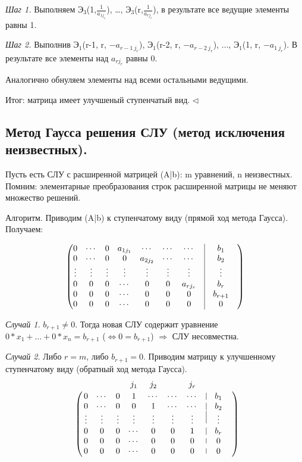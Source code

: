 \textit{Шаг 1.} Выполняем $Э_3$(1,$\frac{1}{a_{1j_1}}$), \dots, $Э_3$(r,$\frac{1}{a_{rj_r}}$), в результате все ведущие элементы равны 1.

\textit{Шаг 2.} Выполнив $Э_1$(r-1, r, $-a_{{r-1}\ j_r}$), $Э_1$(r-2, r, $-a_{{r-2}\ j_r}$), $\dots$, $Э_1$(1, r, $-a_{1\ j_r}$). В результате все элементы над $a_{rj_r}$ равны 0.

Аналогично обнуляем элементы над всеми остальными ведущими. 

Итог: матрица имеет улучшеный ступенчатый вид. $\lhd$

\vspace{\baselineskip}
\subsection{Метод Гаусса решения СЛУ (метод исключения неизвестных).}

Пусть есть СЛУ с расширенной матрицей (A|b): m уравнений, n неизвестных. Помним: элементарные преобразования строк расширенной матрицы не меняют множество решений.

Алгоритм. Приводим (A|b) к ступенчатому виду (прямой ход метода Гаусса). Получаем: 

\[
	\begin{pmatrix}
		0 & \cdots & 0 & a_{1j_1} & \cdots & \cdots & \cdots & \vrule & b_1 \\
		0 & \cdots & 0 & 0 & a_{2j_2} & \cdots & \cdots & \vrule & b_2 \\
       \vdots & \vdots & \vdots& \vdots & \vdots & \vdots & \vdots & \vrule & \vdots & \\ 
       0 & 0 & 0 & \cdots & 0 & 0 & a_{rj_r} & \vrule & b_r \\
       0 & 0 & 0 & \cdots & 0 & 0 & 0 & \vrule & b_{r+1} \\
       0 & 0 & 0 & \cdots & 0 & 0 & 0 & \vrule & 0
	\end{pmatrix}
\]


\textit{Случай 1.} $b_{r+1} \neq 0$. Тогда новая СЛУ содержит уравнение $0*x_1 + \dots + 0*x_n = b_{r+1}$ ($\Leftrightarrow 0 = b_{r+1}$) $\Rightarrow$ СЛУ несовместна.

\textit{Случай 2.} Либо $r = m$, либо $b_{r+1} = 0$. Приводим матрицу к улучшенному ступенчатому виду (обратный ход метода Гаусса).
\[
	\bordermatrix{ 
    	 & & & & j_1 & j_2 & & j_r & \cr
    	 & 0 & \cdots & 0 & 1 & \cdots & \cdots & \cdots & \vrule & b_1 \cr
		 & 0 & \cdots & 0 & 0 & 1 & \cdots & \cdots & \vrule & b_2 \cr
        & \vdots & \vdots & \vdots& \vdots & \vdots & \vdots & \vdots & \vrule & \vdots & \cr 
        & 0 & 0 & 0 & \cdots & 0 & 0 & 1 & \vrule & b_r \cr
        & 0 & 0 & 0 & \cdots & 0 & 0 & 0 & \vrule & 0 \cr
        & 0 & 0 & 0 & \cdots & 0 & 0 & 0 & \vrule & 0}
\]

